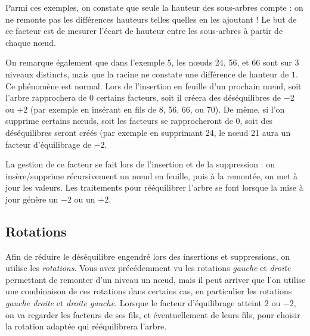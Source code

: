 \documentclass[11pt,a4paper,twoside]{article}
\begin{document}
Parmi ces exemples, on constate que seule la hauteur des sous-arbres compte : on ne remonte pas les différences hauteurs telles quelles en les ajoutant !
Le but de ce facteur est de mesurer l'écart de hauteur entre les sous-arbres à partir de chaque nœud.

\medskip

On remarque également que dans l'exemple 5, les nœuds 24, 56, et 66 sont sur 3 niveaux distincts, mais que la racine ne constate une différence de hauteur de $ 1 $.
Ce phénomène est normal.
Lors de l'insertion en feuille d'un prochain nœud, soit l'arbre rapprochera de $ 0 $ certains facteurs, soit il créera des déséquilibres de $ -2 $ ou $ +2 $ (par exemple en insérant en fils de 8, 56, 66, ou 70).
De même, si l'on supprime certains nœuds, soit les facteurs se rapprocheront de $ 0 $, soit des déséquilibres seront créés (par exemple en supprimant 24, le nœud 21 aura un facteur d'équilibrage de $ -2 $.

\medskip

La gestion de ce facteur se fait lors de l'insertion et de la suppression : on insère/supprime récursivement un nœud en feuille, puis à la remontée, on met à jour les valeurs.
Les traitements pour rééquilibrer l'arbre se font lorsque la mise à jour génère un $ -2 $ ou un $ +2 $.




\subsection{Rotations}

Afin de réduire le déséquilibre engendré lors des insertions et suppressions, on utilise les \textit{rotations}.
Vous avez précédemment vu les rotations \textit{gauche} et \textit{droite} permettant de remonter d'un niveau un nœud, mais il peut arriver que l'on utilise une combinaison de ces rotations dans certains cas, en particulier les rotations \textit{gauche droite} et \textit{droite gauche}.
Lorsque le facteur d'équilibrage atteint $ 2 $ ou $ -2 $, on va regarder les facteurs de ses fils, et éventuellement de leurs fils, pour choisir la rotation adaptée qui rééquilibrera l'arbre.

\end{document}
